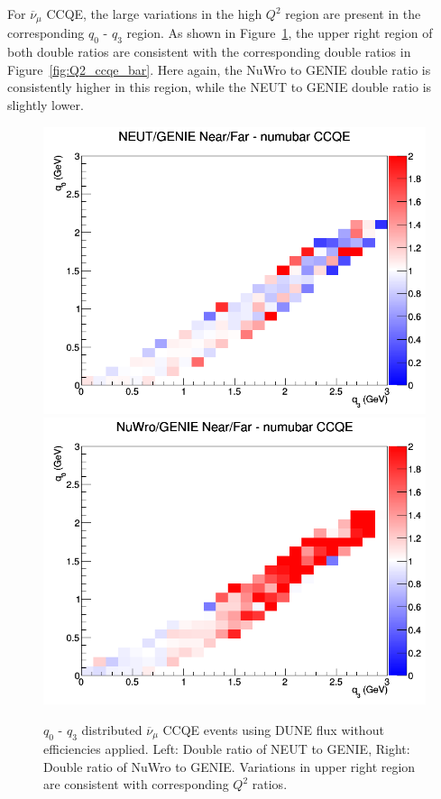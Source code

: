 \documentclass[12pt]{article}
\begin{document}
For $\overline{\nu}_{\mu}$ CCQE, the large variations in the high $Q^2$ region are present in the corresponding $q_0 \textrm{ - } q_3$ region. As shown in Figure~\ref{fig:q0q3_numubar_CCQE_no_eff}, the upper right region of both double ratios are consistent with the corresponding double ratios in Figure~\ref{fig:Q2_ccqe_bar}. Here again, the NuWro to GENIE double ratio is consistently higher in this region, while the NEUT to GENIE double ratio is slightly lower.

\begin{figure}[h]
\centering
{}
\includegraphics[width=\linewidth]{q0_q3/nominal/ratios/CCQE_NEUT_GENIE_numubar_NF_q3_q0.png}
\endminipage
{}
\includegraphics[width=\linewidth]{q0_q3/nominal/ratios/CCQE_NuWro_GENIE_numubar_NF_q3_q0.png}
\endminipage
\caption{$q_0 \textrm{ - } q_3$ distributed $\overline{\nu}_{\mu}$ CCQE events using DUNE flux without efficiencies applied. Left: Double ratio of NEUT to GENIE, Right: Double ratio of NuWro to GENIE. Variations in upper right region are consistent with corresponding $Q^2$ ratios.}
\label{fig:q0q3_numubar_CCQE_no_eff}
\end{figure}
\FloatBarrier
\end{document}
